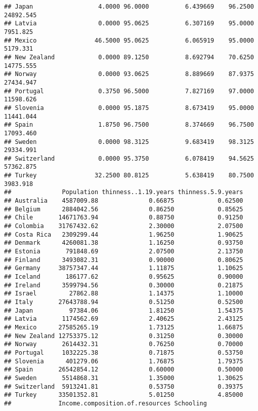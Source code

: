 \documentclass[
]{article}
\begin{document}
\begin{verbatim}
## Japan                  4.0000 96.0000          6.439669    96.2500 24892.545
## Latvia                 0.0000 95.0625          6.307169    95.0000  7951.825
## Mexico                46.5000 95.0625          6.065919    95.0000  5179.331
## New Zealand            0.0000 89.1250          8.692794    70.6250 14775.555
## Norway                 0.0000 93.0625          8.889669    87.9375 27434.947
## Portugal               0.3750 96.5000          7.827169    97.0000 11598.626
## Slovenia               0.0000 95.1875          8.673419    95.0000 11441.044
## Spain                  1.8750 96.7500          8.374669    96.7500 17093.460
## Sweden                 0.0000 98.3125          9.683419    98.3125 29334.991
## Switzerland            0.0000 95.3750          6.078419    94.5625 57362.875
## Turkey                32.2500 80.8125          5.638419    80.7500  3983.918
##              Population thinness..1.19.years thinness.5.9.years
## Australia    4587009.88              0.66875            0.62500
## Belgium      2884042.56              0.86250            0.85625
## Chile       14671763.94              0.88750            0.91250
## Colombia    31767432.62              2.30000            2.07500
## Costa Rica   2309299.44              1.96250            1.90625
## Denmark      4260081.38              1.16250            0.93750
## Estonia       791848.69              2.07500            2.13750
## Finland      3493082.31              0.90000            0.80625
## Germany     38757347.44              1.11875            1.10625
## Iceland       186177.62              0.95625            0.90000
## Ireland      3599794.56              0.30000            0.21875
## Israel         27862.88              1.14375            1.10000
## Italy       27643788.94              0.51250            0.52500
## Japan          97384.06              1.81250            1.54375
## Latvia       1174562.69              2.40625            2.43125
## Mexico      27585265.19              1.73125            1.66875
## New Zealand 12753375.12              0.31250            0.30000
## Norway       2614432.31              0.76250            0.70000
## Portugal     1032225.38              0.71875            0.53750
## Slovenia      401279.06              1.76875            1.79375
## Spain       26542854.12              0.60000            0.50000
## Sweden       5514868.31              1.35000            1.30625
## Switzerland  5913241.81              0.53750            0.39375
## Turkey      33501352.81              5.01250            4.85000
##             Income.composition.of.resources Schooling

\end{verbatim}
\end{document}
